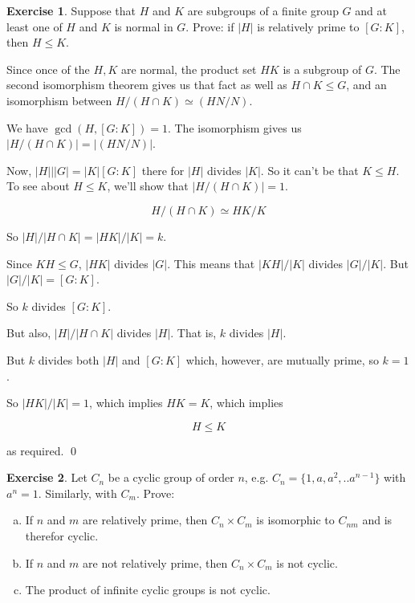 \documentclass[11pt,oneside]{article}
\numberwithin{equation}{section}
\theoremstyle{definition}
\newtheorem{exercise}{Exercise}
\begin{document}
\begin{exercise}
  Suppose that $H$ and $K$ are subgroups of a finite group $G$ and at
  least one of $H$ and $K$ is normal in $G$.  Prove: if $|H|$ is
  relatively prime to $[G:K]$, then $H \leq K$.
\end{exercise}
\begin{solution}
  Since once of the $H, K$ are normal, the product set $HK$ is a
  subgroup of $G$. The second isomorphism theorem gives us that fact
  as well as $H \cap K \leq G$, and an isomorphism between
  $ H / ( H \cap K) \simeq (HN / N)$.

  We have $\gcd(H, [G:K]) = 1$.  The isomorphism gives us $|H / (H \cap K)| = | (HN / N)|$.

  Now, $|H| \vert |G| = |K| [ G:K ]$ there for $|H|$ divides $|K|$.  So it
  can't be that $ K \leq H$.  To see about $ H \leq K$, we'll show
  that $ | H / ( H \cap K )| = 1 $.

  $$
  H / (H \cap K) \simeq HK / K
  $$

  So $|H| / |H \cap K| = |HK| / |K| = k$.  

  Since $KH \leq G$, $ |HK|$ divides $|G|$.  This means that $|KH| / |K|$ divides
  $|G| / |K|$.  But $|G| / |K| = [G: K]$. 

  So $k$ divides $ [G : K]$.

  But also, $|H| / |H \cap K|$ divides $|H|$.  That is, $k$ divides $|H|$.

  But $k$ divides both $|H|$ and $[G : K]$ which, however, are mutually prime, so $k = 1$.

  So $|HK| / |K| = 1$, which implies $ HK = K$, which implies

  $$
  H \leq K
  $$

  as required.
  \qed
  
\end{solution}

\begin{exercise}
  Let $C_n$ be a cyclic group of order $n$, e.g.
  $C_n = \{1, a, a^2, .. a^{n-1} \}$ with $a^n = 1$.  Similarly,
  with $C_m$. Prove:
  \begin{enumerate}[(a)]
  \item
    If $n$ and $m$ are relatively prime, then $C_n \times C_m$ is
    isomorphic to $C_{nm}$ and is therefor cyclic.
  \item
    If $n$ and $m$ are not relatively prime, then $C_n \times C_m$ is
    not cyclic.
  \item
    The product of infinite cyclic groups is not cyclic.
  \end{enumerate}
\end{exercise}
\end{document}
